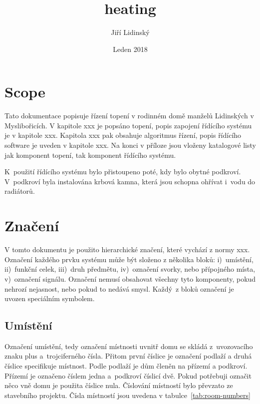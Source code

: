 \documentclass[a4paper,draft]{book}
\title{heating}
\author{Jiří Lidinský}
\date{Leden 2018}
\begin{document}
\frontmatter

\maketitle

\chapter*{Scope}

    Tato dokumentace popisuje řízení topení v rodinném domě manželů Lidinských
    v Myslibořicích. V kapitole xxx je popsáno topení, popis zapojení řídícího
    systému je v kapitole xxx. Kapitola xxx pak obsahuje algoritmus řízení,
    popis řídícího software je uveden v kapitole xxx. Na konci v příloze jsou
    vloženy katalogové listy jak komponent topení, tak komponent řídícího
    systému.

    K~použití řídícího systému bylo přistoupeno poté, kdy bylo obytné podkroví.
    V~podkroví byla instalována krbová kamna, která jsou schopna ohřívat
    i~vodu do radiátorů.

\tableofcontents

\mainmatter

\chapter{Značení}

    V tomto dokumentu je použito hierarchické značení, které vychází z normy
    xxx. Označení každého prvku systému může být složeno z několika bloků:
    i)~umístění, ii)~funkční celek, iii)~druh předmětu, iv)~označení svorky,
    nebo přípojného místa, v)~označení signálu. Označení nemusí obsahovat
    všechny tyto komponenty, pokud nehrozí nejasnost, nebo pokud to nedává
    smysl. Každý~z bloků označení je uvozen speciálním symbolem.

\section{Umístění}

    Označení umístění, tedy označení místnosti uvnitř domu se skládá
    z~uvozovacího znaku plus a~trojciferného čísla. Přitom první číslice
    je označení podlaží a druhá číslice specifikuje místnost. Podle podlaží
    je dům členěn na přízemí a podkroví. Přízemí je označeno číslem jedna
    a~podkroví číslicí dvě. Pokud potřebuji označit něco vně domu je použita
    číslice nula. Číslování místností bylo převzato ze stavebního projektu.
    Čísla místností jsou uvedena v tabulce~\ref{tab:room-numbers}
\end{document}
